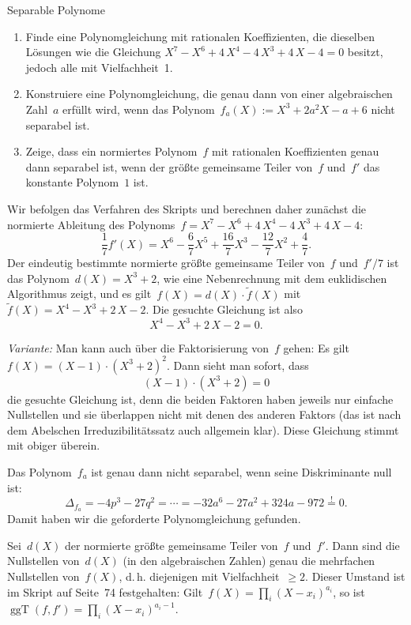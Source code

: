 \documentclass{algblatt}
\begin{document}
\begin{aufgabe}{Separable Polynome}
\begin{enumerate}
\item Finde eine Polynomgleichung mit rationalen
Koeffizienten, die dieselben Lösungen wie die
Gleichung $X^7-X^6+4\,X^4-4\,X^3+4\,X-4=0$ besitzt, jedoch alle mit
Vielfachheit~1.
\item Konstruiere eine Polynomgleichung, die genau dann
von einer algebraischen Zahl~$a$ erfüllt wird, wenn das Polynom~$f_a(X) := X^3
+ 2a^2 X - a + 6$ nicht separabel ist.
\item Zeige, dass ein normiertes Polynom~$f$ mit rationalen Koeffizienten genau
dann separabel ist, 
wenn der größte gemeinsame Teiler von~$f$
und~$f'$ das konstante Polynom~$1$ ist.
\end{enumerate}

\begin{loesungE}
\item Wir befolgen das Verfahren des Skripts und berechnen daher zunächst die
normierte Ableitung des Polynoms~$f = X^7-X^6+4\,X^4-4\,X^3+4\,X-4$:
\[ \frac{1}{7} f'(X) = X^6 - \frac{6}{7} X^5 + \frac{16}{7} X^3 - \frac{12}{7}
X^2 + \frac{4}{7}. \]
Der eindeutig bestimmte normierte größte gemeinsame Teiler von~$f$ und~$f'/7$
ist das Polynom~$d(X) = X^3 + 2$, wie eine Nebenrechnung mit dem euklidischen
Algorithmus zeigt, und es gilt~$f(X) = d(X) \cdot \widetilde f(X)$
mit~$\widetilde f(X) = X^4 - X^3 + 2\,X - 2$. Die gesuchte Gleichung ist also
\[ X^4 - X^3 + 2\,X - 2 = 0. \]

\emph{Variante:} Man kann auch über die Faktorisierung von~$f$ gehen:
Es gilt~$f(X) = (X-1) \cdot (X^3 + 2)^2$. Dann
sieht man sofort, dass
\[ (X-1) \cdot (X^3 + 2) = 0 \]
die gesuchte Gleichung ist, denn die beiden Faktoren haben jeweils nur einfache
Nullstellen und sie überlappen nicht mit denen des anderen Faktors (das ist
nach dem Abelschen Irreduzibilitätssatz auch allgemein klar). Diese Gleichung
stimmt mit obiger überein.

\item Das Polynom~$f_a$ ist genau dann nicht separabel, wenn seine Diskriminante null
ist:
\[ \Delta_{f_a} = -4p^3 - 27q^2 = \cdots =
  -32 a^6 - 27 a^2 + 324 a - 972 \stackrel{!}{=} 0. \]
Damit haben wir die geforderte Polynomgleichung gefunden.

\item Sei~$d(X)$ der normierte größte gemeinsame Teiler
von~$f$ und~$f'$. Dann sind die Nullstellen von~$d(X)$ (in den algebraischen
Zahlen) genau die mehrfachen Nullstellen von~$f(X)$, d.\,h. diejenigen mit
Vielfachheit~$\geq 2$. Dieser Umstand ist im Skript auf Seite~74 festgehalten:
Gilt~$f(X) = \prod_i (X-x_i)^{a_i}$, so ist~$\operatorname{ggT}(f, f') =
\prod_i (X-x_i)^{a_i - 1}$.


\end{loesungE}
\end{aufgabe}
\end{document}
